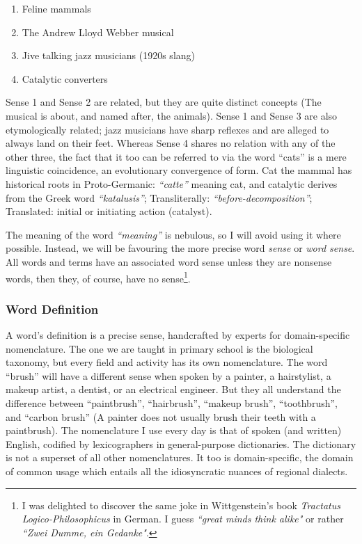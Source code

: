 \newpage
\begin{enumerate}
	\item Feline mammals
	\item The Andrew Lloyd Webber musical
	\item Jive talking jazz musicians (1920s slang)
	\item Catalytic converters
\end{enumerate}

Sense 1 and Sense 2 are related, but they are quite distinct concepts (The musical is about, and named after, the animals). Sense 1 and Sense 3 are also etymologically related; jazz musicians have sharp reflexes and are alleged to always land on their feet. Whereas Sense 4 shares no relation with any of the other three, the fact that it too can be referred to via the word ``cats'' is a mere linguistic coincidence, an evolutionary convergence of form. Cat the mammal has historical roots in Proto-Germanic: \textit{``catte''} meaning cat, and catalytic derives from the Greek word \textit{``katalusis''}; Transliterally: \textit{``before-decomposition''}; Translated: initial or initiating action (catalyst).

The meaning of the word \textit{``meaning''} is nebulous, so I will avoid using it where possible. Instead, we will be favouring the more precise word \textit{sense} or \textit{word sense}. All words and terms have an associated word sense unless they are nonsense words, then they, of course, have no sense\footnote{I was delighted to discover the same joke in Wittgenstein's book \textit{Tractatus Logico-Philosophicus} in German. I guess \textit{``great minds think alike"} or rather \textit{``Zwei Dumme, ein Gedanke"}.}.

\subsubsection{Word Definition}
A word's definition is a precise sense, handcrafted by experts for domain-specific nomenclature. The one we are taught in primary school is the biological taxonomy, but every field and activity has its own nomenclature. The word ``brush'' will have a different sense when spoken by a painter, a hairstylist, a makeup artist, a dentist, or an electrical engineer. But they all understand the difference between ``paintbrush'', ``hairbrush'', ``makeup brush'', ``toothbrush'', and ``carbon brush'' (A painter does not usually brush their teeth with a paintbrush). The nomenclature I use every day is that of spoken (and written) English, codified by lexicographers in general-purpose dictionaries. The dictionary is not a superset of all other nomenclatures. It too is domain-specific, the domain of common usage which entails all the idiosyncratic nuances of regional dialects.

